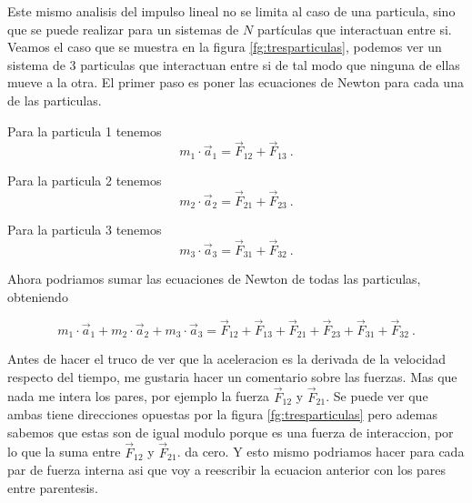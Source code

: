 \documentclass[../Main.tex]{subfiles}
\begin{document}
{    Este mismo analisis del impulso lineal no se limita al caso de una particula,
    sino que se puede realizar para un sistemas de $N$ partículas que interactuan
    entre si.
    Veamos el caso que se muestra en la figura \ref{fg:tresparticulas}, podemos ver
    un sistema de 3 particulas que interactuan entre si de tal modo que ninguna de
    ellas mueve a la otra. El primer paso es poner las ecuaciones de Newton para
    cada una de las particulas.

    Para la particula 1 tenemos
    \begin{equation*}
        m_1 \cdot \vec{a} _1 = \vec{F} _{12} + \vec{F} _{13} \ .
    \end{equation*}

}

\npage{
}
{
    Para la particula 2 tenemos
    \begin{equation*}
        m_2 \cdot \vec{a} _2 = \vec{F} _{21} + \vec{F} _{23} \ .
    \end{equation*}

    Para la particula 3 tenemos
    \begin{equation*}
        m_3 \cdot \vec{a} _3 = \vec{F} _{31} + \vec{F} _{32} \ .
    \end{equation*}

    Ahora podriamos sumar las ecuaciones de Newton de todas las particulas,
    obteniendo

    \begin{equation*}
        m_1 \cdot \vec{a} _1 + m_2 \cdot \vec{a} _2 + m_3 \cdot \vec{a} _3 = \vec{F} _{12} + \vec{F} _{13} + \vec{F} _{21} + \vec{F} _{23} + \vec{F} _{31} + \vec{F} _{32} \ .
    \end{equation*}

    Antes de hacer el truco de ver que la aceleracion es la derivada de la
    velocidad respecto del tiempo, me gustaria hacer un comentario sobre las
    fuerzas. Mas que nada me intera los pares, por ejemplo la fuerza $\vec{F} _{12}$
    y $\vec{F} _{21} $. Se puede ver que ambas tiene direcciones opuestas por la
    figura \ref{fg:tresparticulas} pero ademas sabemos que estas son de igual modulo porque es una
    fuerza de interaccion, por lo que la suma entre $\vec{F} _{12}$ y $\vec{F} _{21}$.
    da cero. Y esto mismo podriamos hacer para cada par de fuerza interna asi que
    voy a reescribir la ecuacion anterior con los pares entre parentesis.

}
\end{document}
